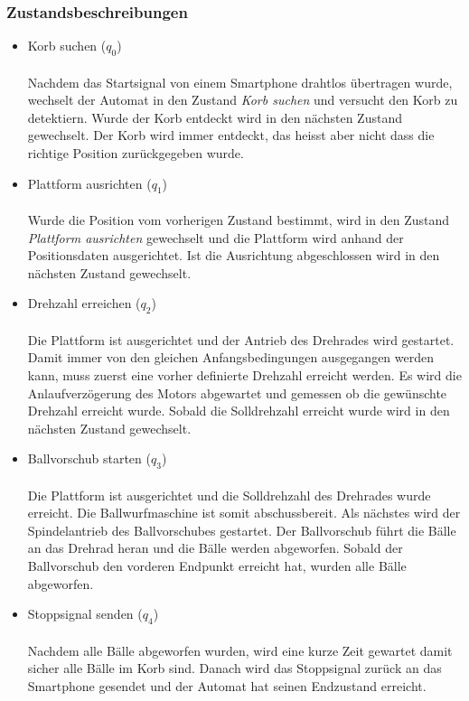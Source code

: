 \subsubsection{Zustandsbeschreibungen}
\begin{itemize}
	
	\item Korb suchen ($q_{0}$) \\ \\
		  Nachdem das Startsignal von einem Smartphone drahtlos übertragen wurde, wechselt der Automat in den Zustand \textit{Korb suchen} und versucht den Korb zu detektiern. Wurde der Korb entdeckt wird in den nächsten Zustand gewechselt. Der Korb wird immer entdeckt, das heisst aber nicht dass die richtige Position zurückgegeben wurde.
		  
	\item Plattform ausrichten ($q_{1}$) \\ \\
		  Wurde die Position vom vorherigen Zustand bestimmt, wird in den Zustand \textit{Plattform ausrichten} gewechselt und die Plattform wird anhand der Positionsdaten ausgerichtet. Ist die Ausrichtung abgeschlossen wird in den nächsten Zustand gewechselt.
		  
	\item Drehzahl erreichen ($q_{2}$) \\ \\
		  Die Plattform ist ausgerichtet und der Antrieb des Drehrades wird gestartet. Damit immer von den gleichen Anfangsbedingungen ausgegangen werden kann, muss zuerst eine vorher definierte Drehzahl erreicht werden. Es wird die Anlaufverzögerung des Motors abgewartet und gemessen ob die gewünschte Drehzahl erreicht wurde. Sobald die Solldrehzahl erreicht wurde wird in den nächsten Zustand gewechselt.
		  
	\item Ballvorschub starten ($q_{3}$) \\ \\
		  Die Plattform ist ausgerichtet und die Solldrehzahl des Drehrades wurde erreicht. Die Ballwurfmaschine ist somit abschussbereit. Als nächstes wird der Spindelantrieb des Ballvorschubes gestartet. Der Ballvorschub führt die Bälle an das Drehrad heran und die Bälle werden abgeworfen. Sobald der Ballvorschub den vorderen Endpunkt erreicht hat, wurden alle Bälle abgeworfen.
		  
	\item Stoppsignal senden ($q_{4}$) \\ \\
		  Nachdem alle Bälle abgeworfen wurden, wird eine kurze Zeit gewartet damit sicher alle Bälle im Korb sind. Danach wird das Stoppsignal zurück an das Smartphone gesendet und der Automat hat seinen Endzustand erreicht.	  
		  
\end{itemize}

